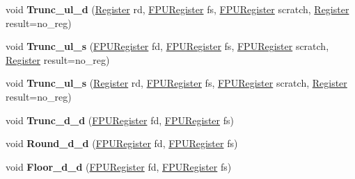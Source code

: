 \begin{DoxyCompactItemize}
void {\bfseries Trunc\+\_\+ul\+\_\+d} (\mbox{\hyperlink{classv8_1_1internal_1_1Register}{Register}} rd, \mbox{\hyperlink{classv8_1_1internal_1_1FPURegister}{F\+P\+U\+Register}} fs, \mbox{\hyperlink{classv8_1_1internal_1_1FPURegister}{F\+P\+U\+Register}} scratch, \mbox{\hyperlink{classv8_1_1internal_1_1Register}{Register}} result=no\+\_\+reg)
\item 
\mbox{\label{classv8_1_1internal_1_1TurboAssembler_aba53630430c54118bff7d49947da707c}} 
void {\bfseries Trunc\+\_\+ul\+\_\+s} (\mbox{\hyperlink{classv8_1_1internal_1_1FPURegister}{F\+P\+U\+Register}} fd, \mbox{\hyperlink{classv8_1_1internal_1_1FPURegister}{F\+P\+U\+Register}} fs, \mbox{\hyperlink{classv8_1_1internal_1_1FPURegister}{F\+P\+U\+Register}} scratch, \mbox{\hyperlink{classv8_1_1internal_1_1Register}{Register}} result=no\+\_\+reg)
\item 
\mbox{\label{classv8_1_1internal_1_1TurboAssembler_a1196af52a53f92792159763cbff3c503}} 
void {\bfseries Trunc\+\_\+ul\+\_\+s} (\mbox{\hyperlink{classv8_1_1internal_1_1Register}{Register}} rd, \mbox{\hyperlink{classv8_1_1internal_1_1FPURegister}{F\+P\+U\+Register}} fs, \mbox{\hyperlink{classv8_1_1internal_1_1FPURegister}{F\+P\+U\+Register}} scratch, \mbox{\hyperlink{classv8_1_1internal_1_1Register}{Register}} result=no\+\_\+reg)
\item 
\mbox{\label{classv8_1_1internal_1_1TurboAssembler_a04aa2d1a94b66bf89414f7790979dfba}} 
void {\bfseries Trunc\+\_\+d\+\_\+d} (\mbox{\hyperlink{classv8_1_1internal_1_1FPURegister}{F\+P\+U\+Register}} fd, \mbox{\hyperlink{classv8_1_1internal_1_1FPURegister}{F\+P\+U\+Register}} fs)
\item 
\mbox{\label{classv8_1_1internal_1_1TurboAssembler_acd24746e7136a35c3d6b88ded7e18881}} 
void {\bfseries Round\+\_\+d\+\_\+d} (\mbox{\hyperlink{classv8_1_1internal_1_1FPURegister}{F\+P\+U\+Register}} fd, \mbox{\hyperlink{classv8_1_1internal_1_1FPURegister}{F\+P\+U\+Register}} fs)
\item 
\mbox{\label{classv8_1_1internal_1_1TurboAssembler_a2371d2078483af9cfde50e00bd18433b}} 
void {\bfseries Floor\+\_\+d\+\_\+d} (\mbox{\hyperlink{classv8_1_1internal_1_1FPURegister}{F\+P\+U\+Register}} fd, \mbox{\hyperlink{classv8_1_1internal_1_1FPURegister}{F\+P\+U\+Register}} fs)

\end{DoxyCompactItemize}
